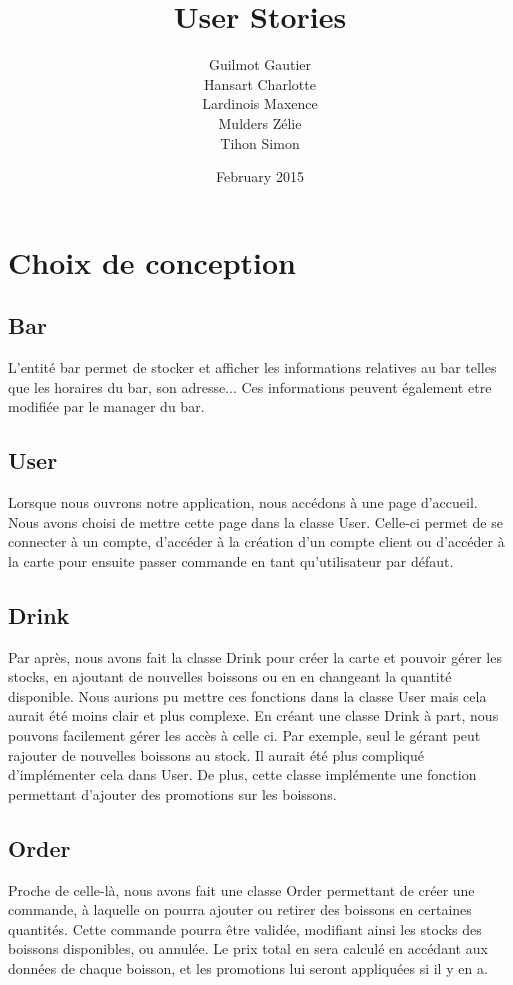 \documentclass{article}
\title{User Stories}
\author{Guilmot Gautier \\ Hansart Charlotte \\ Lardinois Maxence \\ Mulders Zélie \\ Tihon Simon  }
\date{February 2015}
\begin{document}
\maketitle
\section{Choix de conception}
\subsection{Bar}
L'entité bar permet de stocker et afficher les informations relatives au bar telles que les horaires du bar, son adresse... Ces informations peuvent également etre modifiée par le manager du bar.

\subsection{User}
Lorsque nous ouvrons notre application, nous accédons à une page d'accueil. Nous avons choisi de mettre cette page dans la classe User. Celle-ci permet de se connecter à un compte, d'accéder à la création d'un compte client ou d'accéder à la carte pour ensuite passer commande en tant qu'utilisateur par défaut.
\subsection{Drink}
Par après, nous avons fait la classe Drink pour créer la carte et pouvoir gérer les stocks, en ajoutant de nouvelles boissons ou en en changeant la quantité disponible. Nous aurions pu mettre ces fonctions dans la classe User mais cela aurait été moins clair et plus complexe. En créant une classe Drink à part, nous pouvons facilement gérer les accès à celle ci. Par exemple, seul le gérant peut rajouter de nouvelles boissons au stock. Il aurait été plus compliqué d'implémenter cela dans User. De plus, cette classe implémente une fonction permettant d'ajouter des promotions sur les boissons.
\subsection{Order}
Proche de celle-là, nous avons fait une classe Order permettant de créer une commande, à laquelle on pourra ajouter ou retirer des boissons en certaines quantités. Cette commande pourra être validée, modifiant ainsi les stocks des boissons disponibles, ou annulée. Le prix total en sera calculé en accédant aux données de chaque boisson, et les promotions lui seront appliquées si il y en a.
\end{document}
